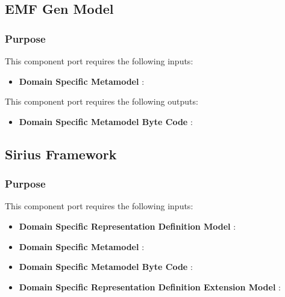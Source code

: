 \documentclass{gemoc} %
\begin{document}
\subsection{EMF Gen Model}


\subsubsection{Purpose}

This component port requires the following inputs:
\begin{itemize}
  \item \textbf{Domain Specific Metamodel} :
\end{itemize}

This component port requires the following outputs:
\begin{itemize}
  \item \textbf{Domain Specific Metamodel Byte Code} :
\end{itemize}

\subsection{Sirius Framework}


\subsubsection{Purpose}

This component port requires the following inputs:
\begin{itemize}
  \item \textbf{Domain Specific  Representation Definition Model} :
  \item \textbf{Domain Specific Metamodel} :
  \item \textbf{Domain Specific Metamodel Byte Code} :
  \item \textbf{Domain Specific Representation Definition Extension Model} :
\end{itemize}
\end{document}
